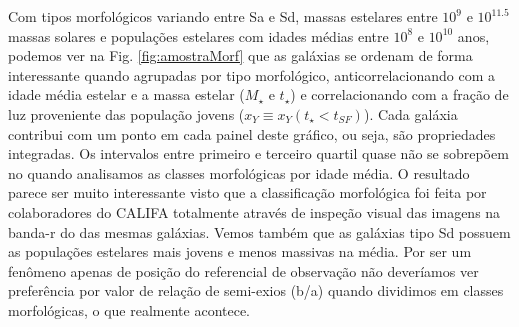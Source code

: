 Com tipos morfológicos variando entre Sa e Sd, massas estelares entre $10^9$ e $10^{11.5}$ massas
solares e populações estelares com idades médias entre $10^8$ e $10^{10}$ anos, podemos ver na Fig.
\ref{fig:amostraMorf} que as galáxias se ordenam de forma interessante quando agrupadas por tipo
morfológico, anticorrelacionando com a idade média estelar e a massa estelar ($M_\star$ e $t_\star$)
e correlacionando com a fração de luz proveniente das população jovens ($x_Y \equiv x_Y(t_\star <
t_{SF})$). Cada galáxia contribui com um ponto em cada painel deste gráfico, ou seja, são
propriedades integradas. Os intervalos entre primeiro e terceiro quartil quase não se sobrepõem no
quando analisamos as classes morfológicas por idade média. O resultado parece ser muito interessante
visto que a classificação morfológica foi feita por colaboradores do CALIFA totalmente através de
inspeção visual das imagens na banda-r do \SDSS das mesmas galáxias. Vemos também que as galáxias
tipo Sd possuem as populações estelares mais jovens e menos massivas na média. Por ser um fenômeno
apenas de posição do referencial de observação não deveríamos ver preferência por valor de relação
de semi-exios (b/a) quando dividimos em classes morfológicas, o que realmente acontece.

